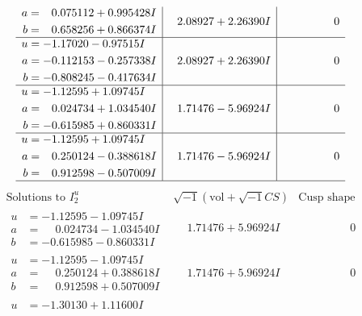 \documentclass[1p]{elsarticle_modified}
\theoremstyle{definition}
\newcommand{\I}{\sqrt{-1}}
\begin{document}
$$\begin{array}{c|c|c}
\begin{aligned}
a &= \phantom{-}0.075112 + 0.995428 I \\
b &= \phantom{-}0.658256 + 0.866374 I\end{aligned}
 & \phantom{-}2.08927 + 2.26390 I & \phantom{-0.000000 } 0 \\ \hline\begin{aligned}
u &= -1.17020 - 0.97515 I \\
a &= -0.112153 - 0.257338 I \\
b &= -0.808245 - 0.417634 I\end{aligned}
 & \phantom{-}2.08927 + 2.26390 I & \phantom{-0.000000 } 0 \\ \hline\begin{aligned}
u &= -1.12595 + 1.09745 I \\
a &= \phantom{-}0.024734 + 1.034540 I \\
b &= -0.615985 + 0.860331 I\end{aligned}
 & \phantom{-}1.71476 - 5.96924 I & \phantom{-0.000000 } 0 \\ \hline\begin{aligned}
u &= -1.12595 + 1.09745 I \\
a &= \phantom{-}0.250124 - 0.388618 I \\
b &= \phantom{-}0.912598 - 0.507009 I\end{aligned}
 & \phantom{-}1.71476 - 5.96924 I & \phantom{-0.000000 } 0\\
 \hline 
 \end{array}$$\newpage$$\begin{array}{c|c|c}  
\text{Solutions to }I^u_{2}& \I (\text{vol} + \sqrt{-1}CS) & \text{Cusp shape}\\
 \hline 
\begin{aligned}
u &= -1.12595 - 1.09745 I \\
a &= \phantom{-}0.024734 - 1.034540 I \\
b &= -0.615985 - 0.860331 I\end{aligned}
 & \phantom{-}1.71476 + 5.96924 I & \phantom{-0.000000 } 0 \\ \hline\begin{aligned}
u &= -1.12595 - 1.09745 I \\
a &= \phantom{-}0.250124 + 0.388618 I \\
b &= \phantom{-}0.912598 + 0.507009 I\end{aligned}
 & \phantom{-}1.71476 + 5.96924 I & \phantom{-0.000000 } 0 \\ \hline\begin{aligned}
u &= -1.30130 + 1.11600 I \\

\end{aligned}
\end{array}$$
\end{document}
